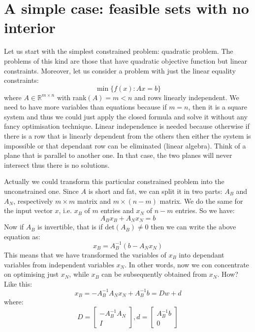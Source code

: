 \section{A simple case: feasible sets with no interior}
\par Let us start with the simplest constrained problem: quadratic problem. The problems of this kind are those that have quadratic objective function but linear constraints. Moreover, let us consider a problem with just the linear equality constraints:
\begin{equation}
    \min\{f(x) : Ax = b\}
\end{equation}
where $A \in \mathbb{R}^{m \times n}$ with rank$(A) = m < n$ and rows linearly independent. We need to have more variables than equations because if $m = n$, then it is a square system and thus we could just apply the closed formula and solve it without any fancy optimisation technique. Linear independence is needed because otherwise if there is a row that is linearly dependent from the others then either the system is impossible or that dependant row can be eliminated (linear algebra). Think of a plane that is parallel to another one. In that case, the two planes will never intersect thus there is no solutions.
\par Actually we could transform this particular constrained problem into the unconstrained one. Since $A$ is short and fat, we can split it in two parts: $A_B$ and $A_N$, respectively $m \times m$ matrix and $m \times (n-m)$ matrix. We do the same for the input vector $x$, i.e. $x_B$ of $m$ entries and $x_N$ of $n-m$ entries. So we have:
\begin{equation}
    A_B x_B + A_N x_N = b
\end{equation}
Now if $A_B$ is invertible, that is if det$(A_B) \neq 0$ then we can write the above equation as:
\begin{equation}
    x_B = A_B^{-1}(b - A_N x_N)
\end{equation}
This means that we have transformed the variables of $x_B$ into dependant variables from independent variables $x_N$. In other words, now we con concentrate on optimising just $x_N$, while $x_B$ can be subsequently obtained from $x_N$. How? Like this:
\begin{equation}
    x_B = -A_B^{-1} A_N x_N + A_B^{-1}b = Dw + d
\end{equation}
where:
\[
D = \left[
  \begin{array}{c}
  -A_B^{-1}A_N \\
  I
  \end{array}
\right],
d = \left[
  \begin{array}{c}
  A_B^{-1}b \\
  0
  \end{array}
\right]
\]
